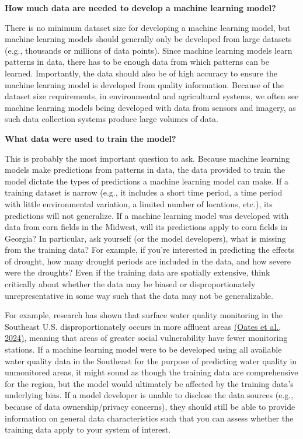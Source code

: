 \documentclass[
]{book}
\begin{document}
\textbf{How much data are needed to develop a machine learning model?}

There is no minimum dataset size for developing a machine learning model, but machine learning models should generally only be developed from large datasets (e.g., thousands or millions of data points). Since machine learning models learn patterns in data, there has to be enough data from which patterns can be learned. Importantly, the data should also be of high accuracy to ensure the machine learning model is developed from quality information. Because of the dataset size requirements, in environmental and agricultural systems, we often see machine learning models being developed with data from sensors and imagery, as such data collection systems produce large volumes of data.

\textbf{What data were used to train the model?}

This is probably the most important question to ask. Because machine learning models make predictions from patterns in data, the data provided to train the model dictate the types of predictions a machine learning model can make. If a training dataset is narrow (e.g., it includes a short time period, a time period with little environmental variation, a limited number of locations, etc.), its predictions will not generalize. If a machine learning model was developed with data from corn fields in the Midwest, will its predictions apply to corn fields in Georgia? In particular, ask yourself (or the model developers), what is missing from the training data? For example, if you're interested in predicting the effects of drought, how many drought periods are included in the data, and how severe were the droughts? Even if the training data are spatially extensive, think critically about whether the data may be biased or disproportionately unrepresentative in some way such that the data may not be generalizable.

For example, research has shown that surface water quality monitoring in the Southeast U.S. disproportionately occurs in more affluent areas \href{https://doi.org/10.22541/essoar.172191636.66550095/v2}{(Oates et al., 2024)}, meaning that areas of greater social vulnerability have fewer monitoring stations. If a machine learning model were to be developed using all available water quality data in the Southeast for the purpose of predicting water quality in unmonitored areas, it might sound as though the training data are comprehensive for the region, but the model would ultimately be affected by the training data's underlying bias. If a model developer is unable to disclose the data sources (e.g., because of data ownership/privacy concerns), they should still be able to provide information on general data characteristics such that you can assess whether the training data apply to your system of interest.
\end{document}
